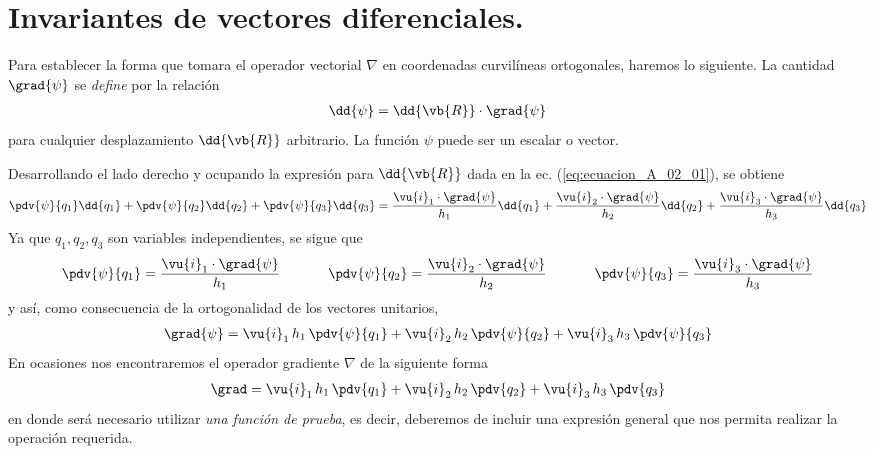 \section{Invariantes de vectores diferenciales.}
Para establecer la forma que tomara el operador vectorial $\nabla$ en coordenadas curvilíneas ortogonales, haremos lo siguiente. La cantidad $\grad{\psi}$ se \emph{define} por la relación
\begin{align*}
\dd{\psi} = \dd{\vb{R}} \cdot \grad{\psi}
\end{align*}
para cualquier desplazamiento $\dd{\vb{R}}$ arbitrario. La función $\psi$ puede ser un escalar o vector.
\par
Desarrollando el lado derecho y ocupando la expresión para $\dd{\vb{R}}$ dada en la ec. (\ref{eq:ecuacion_A_02_01}), se obtiene
\begin{align*}
\pdv{\psi}{q_{1}} \dd{q_{1}} + \pdv{\psi}{q_{2}} \dd{q_{2}} + \pdv{\psi}{q_{3}} \dd{q_{3}} = \dfrac{\vu{i}_{1} \cdot \grad{\psi}}{h_{1}} \dd{q_{1}} + \dfrac{\vu{i}_{2} \cdot \grad{\psi}}{h_{2}} \dd{q_{2}} + \dfrac{\vu{i}_{3} \cdot \grad{\psi}}{h_{3}} \dd{q_{3}}
\end{align*}
Ya que $q_{1}, q_{2}, q_{3}$ son variables independientes, se sigue que
\begin{align*}
\pdv{\psi}{q_{1}} = \dfrac{\vu{i}_{1} \cdot \grad{\psi}}{h_{1}} \hspace{1.2cm} \pdv{\psi}{q_{2}} = \dfrac{\vu{i}_{2} \cdot \grad{\psi}}{h_{2}} \hspace{1.2cm} \pdv{\psi}{q_{3}} = \dfrac{\vu{i}_{3} \cdot \grad{\psi}}{h_{3}}
\end{align*}
y así, como consecuencia de la ortogonalidad de los vectores unitarios,
\begin{align}
\grad{\psi} = \vu{i}_{1} \, h_{1} \, \pdv{\psi}{q_{1}} + \vu{i}_{2} \, h_{2} \, \pdv{\psi}{q_{2}} + \vu{i}_{3} \, h_{3} \, \pdv{\psi}{q_{3}}
\label{eq:ecuacion_A_05_01}    
\end{align}
En ocasiones nos encontraremos el operador gradiente $\nabla$ de la siguiente forma
\begin{align}
\grad = \vu{i}_{1} \, h_{1} \, \pdv{q_{1}} + \vu{i}_{2} \, h_{2} \, \pdv{q_{2}} + \vu{i}_{3} \, h_{3} \, \pdv{q_{3}}
\label{eq:ecuacion_A_05_02}    
\end{align}
en donde será necesario utilizar \emph{una función de prueba}, es decir, deberemos de incluir una expresión general que nos permita realizar la operación requerida.

